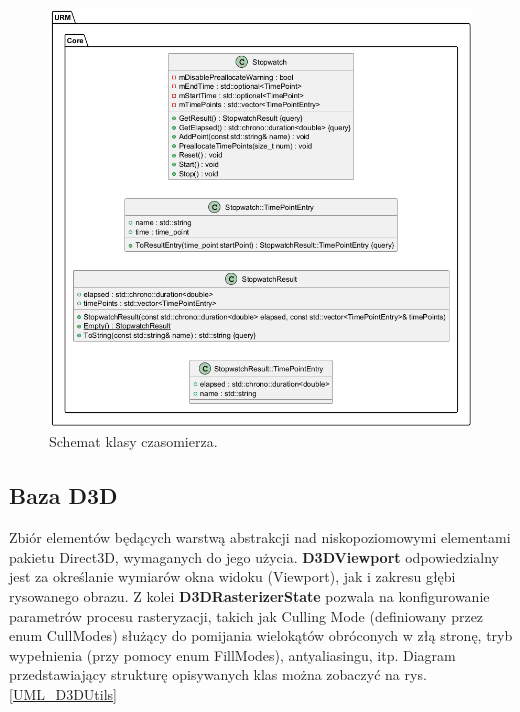 	\begin{figure}[h!]
		\centering
		\includegraphics[width=\textwidth]{images/UML/stopwatch.png}
		\caption{Schemat klasy czasomierza.}
		\label{UML_Stopwatch}
	\end{figure}
	
\subsection{Baza D3D}
	Zbiór elementów będących warstwą abstrakcji nad niskopoziomowymi elementami pakietu Direct3D, wymaganych do jego użycia.
	\textbf{D3DViewport} odpowiedzialny jest za określanie wymiarów okna widoku (Viewport), jak i zakresu głębi rysowanego obrazu.
	Z kolei \textbf{D3DRasterizerState} pozwala na konfigurowanie parametrów procesu rasteryzacji, takich jak Culling Mode (definiowany przez enum CullModes) służący do pomijania wielokątów obróconych w złą stronę, tryb wypełnienia (przy pomocy enum FillModes), antyaliasingu, itp.
	Diagram przedstawiający strukturę opisywanych klas można zobaczyć na rys. \ref{UML_D3DUtils}
	

